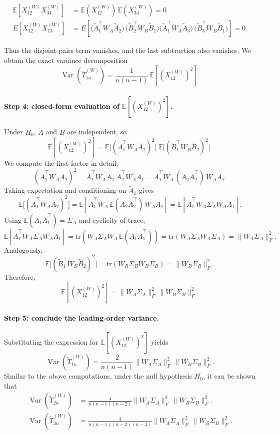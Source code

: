 \documentclass[12pt,reqno,oneside]{amsbook}
\theoremstyle{definition}
\theoremstyle{remark}
\DeclareMathOperator{\Var}{Var}
\begin{document}
\begin{align*}
\mathbb E\!\left[X_{12}^{(W)}X_{34}^{(W)}\right]
&=
\mathbb E(X_{12}^{(W)})\,\mathbb E(X_{34}^{(W)})
=0\\
E[X_{12}^{(W)}X_{13}^{(W)}]
&=E[\bigl(\tilde A_1^\top W_A \tilde A_2\bigr)\,
\bigl(\tilde B_2^\top W_B \tilde B_1  \bigr)
\bigl(\tilde A_1^\top W_A \tilde A_3\bigr)\,
\bigl(\tilde B_3^\top W_B \tilde B_1\bigr)]=0.
\end{align*}

Thus the disjoint-pairs term vanishes, and the last subtraction also vanishes.
We obtain the exact variance decomposition
\[
\Var(\tilde T_{1n}^{(W)})
=
\frac{1}{n(n-1)}\,\mathbb E[(X_{12}^{(W)})^2].
\]
\paragraph{Step 4: closed-form evaluation of $\mathbb E[(X_{12}^{(W)})^2]$.}
Under $H_0$, $\tilde A$ and $\tilde B$ are independent, so
\[
\mathbb E[(X_{12}^{(W)})^2]
=
\mathbb E\big[(\tilde A_1^\top W_A \tilde A_2)^2\big]\;
\mathbb E\big[(\tilde B_1^\top W_B \tilde B_2)^2\big].
\]
We compute the first factor in detail:
\[
(\tilde A_1^\top W_A \tilde A_2)^2
=
\tilde A_1^\top W_A \tilde A_2\;\tilde A_2^\top W_A \tilde A_1
=
\tilde A_1^\top W_A\,(\tilde A_2\tilde A_2^\top)\,W_A \tilde A_1.
\]
Taking expectation and conditioning on $\tilde A_1$ gives
\[
\mathbb E\big[(\tilde A_1^\top W_A \tilde A_2)^2\big]
=
\mathbb E\!\left[
\tilde A_1^\top W_A\,\mathbb E(\tilde A_2\tilde A_2^\top)\,W_A \tilde A_1
\right]
=
\mathbb E\!\left[\tilde A_1^\top W_A\Sigma_A W_A \tilde A_1\right].
\]
Using $\mathbb E(\tilde A_1\tilde A_1^\top)=\Sigma_A$ and cyclicity of trace,
\[
\mathbb E\!\left[\tilde A_1^\top W_A\Sigma_A W_A \tilde A_1\right]
=
\mbox{tr}\!\left(W_A\Sigma_A W_A\,\mathbb E(\tilde A_1\tilde A_1^\top)\right)
=
\mbox{tr}(W_A\Sigma_A W_A\Sigma_A)
=
\|W_A\Sigma_A\|_F^2.
\]
Analogously,
\[
\mathbb E\big[(\tilde B_1^\top W_B \tilde B_2)^2\big]
=
\mbox{tr}(W_B\Sigma_B W_B\Sigma_B)
=
\|W_B\Sigma_B\|_F^2.
\]
Therefore,
\[
\mathbb E[(X_{12}^{(W)})^2]
=
\|W_A\Sigma_A\|_F^2\,\|W_B\Sigma_B\|_F^2.
\]

\paragraph{Step 5: conclude the leading-order variance.}
Substituting the expression for $\mathbb E[(X_{12}^{(W)})^2]$ yields
\[
\Var(\tilde T_{1n}^{(W)})
=
\frac{2}{n(n-1)}\|W_A\Sigma_A\|_F^2\,\|W_B\Sigma_B\|_F^2.
\]
Similar to the above computations, under the null hypothesis $H_0$, it 
can be shown that
\begin{align*}
\Var(\tilde T_{2n}^{(W)})
&=
\frac{4}{n(n-1)(n-2)}\|W_A\Sigma_A\|_F^2\,\|W_B\Sigma_B\|_F^2.\\
\Var(\tilde T_{3n}^{(W)})
&=
\frac{4}{n(n-1)(n-2)(n-3)}\|W_A\Sigma_A\|_F^2\,\|W_B\Sigma_B\|_F^2.
\end{align*}
\end{document}
